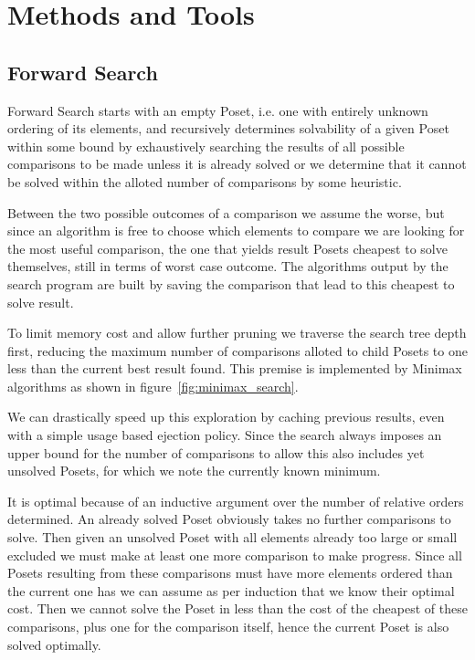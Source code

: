 \documentclass[10pt,journal,compsoc]{IEEEtran}
\begin{document}
\section{Methods and Tools}
\subsection{Forward Search}
Forward Search starts with an empty Poset, i.e. one with entirely unknown ordering of its elements,
and recursively determines solvability of a given Poset within some bound by exhaustively searching
the results of all possible comparisons to be made unless it is already solved or we determine that
it cannot be solved within the alloted number of comparisons by some heuristic.

Between the two possible outcomes of a comparison we assume the worse, but since an algorithm is
free to choose which elements to compare we are looking for the most useful comparison, the one that
yields result Posets cheapest to solve themselves, still in terms of worst case outcome. The
algorithms output by the search program are built by saving the comparison that lead to this
cheapest to solve result.

To limit memory cost and allow further pruning we traverse the search tree depth first, reducing the
maximum number of comparisons alloted to child Posets to one less than the current best result
found. This premise is implemented by Minimax algorithms as shown in
figure~\ref{fig:minimax_search}.

We can drastically speed up this exploration by caching previous results, even with a simple usage
based ejection policy. Since the search always imposes an upper bound for the number of comparisons
to allow this also includes yet unsolved Posets, for which we note the currently known minimum.

It is optimal because of an inductive argument over the number of relative orders determined. An
already solved Poset obviously takes no further comparisons to solve. Then given an unsolved Poset
with all elements already too large or small excluded we must make at least one more comparison to
make progress. Since all Posets resulting from these comparisons must have more elements ordered
than the current one has we can assume as per induction that we know their optimal cost. Then we
cannot solve the Poset in less than the cost of the cheapest of these comparisons, plus one for the
comparison itself, hence the current Poset is also solved optimally.
\end{document}
